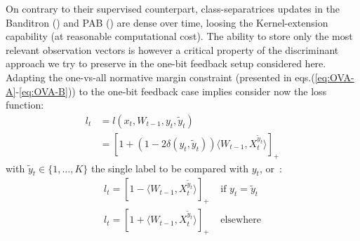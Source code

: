 \documentclass[preprint,12pt,authoryear]{elsarticle}
\begin{document}
On contrary to their supervised counterpart, class-separatrices updates in the Banditron (\cite{kakade2008efficient}) and PAB (\cite{zhong2015esann}) are dense over time, loosing the Kernel-extension capability (at reasonable computational cost). 
The ability to store only the most relevant observation vectors is however a critical property of the discriminant approach we try to preserve in the one-bit feedback setup considered here. 
Adapting the one-vs-all normative margin constraint (presented in eqs.(\ref{eq:OVA-A}-\ref{eq:OVA-B})) to the one-bit feedback case implies consider now the loss function:
\begin{align}\label{eq:loss}
l_t &= l(x_t,W_{t-1},y_t,\tilde{y}_t)\nonumber\\
&= [1 + (1 - 2 \delta(y_t,\tilde{y}_t)) \langle W_{t-1}, X_t^{\tilde{y}_t}\rangle]_+
\end{align}
with $\tilde{y}_t \in \{1,...,K\}$ the single label to be compared with $y_t$, or~:
\begin{align}
l_t = [1 - \langle W_{t-1}, X_t^{\tilde{y}_t}\rangle]_+ &\text{ if }y_t=\tilde{y}_t\label{eq:loss-A}\\
l_t = [1 + \langle W_{t-1}, X_t^{\tilde{y}_t}\rangle]_+ &\text{ elsewhere} \label{eq:loss-B}
\end{align}




{\color{blue} }
\end{document}
